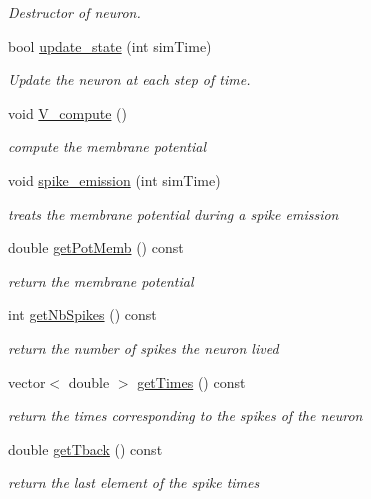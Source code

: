 \begin{DoxyCompactItemize}
\begin{DoxyCompactList}\small\item\em Destructor of neuron. \end{DoxyCompactList}\item 
bool \hyperlink{classNeuron_a27200532368d5d042a7c575ef031f113}{update\-\_\-state} (int sim\-Time)
\begin{DoxyCompactList}\small\item\em Update the neuron at each step of time. \end{DoxyCompactList}\item 
void \hyperlink{classNeuron_a78ad401819336b210c9f0a1b7b676e53}{V\-\_\-compute} ()
\begin{DoxyCompactList}\small\item\em compute the membrane potential \end{DoxyCompactList}\item 
void \hyperlink{classNeuron_a9d1f9ce3ee43c74eb0ff15b72256c417}{spike\-\_\-emission} (int sim\-Time)
\begin{DoxyCompactList}\small\item\em treats the membrane potential during a spike emission \end{DoxyCompactList}\item 
double \hyperlink{classNeuron_a8b4af30d823975f3b2ef3ae534f9ae5f}{get\-Pot\-Memb} () const 
\begin{DoxyCompactList}\small\item\em return the membrane potential \end{DoxyCompactList}\item 
int \hyperlink{classNeuron_ab1efa405eb0cd7bac6ca012c961efe5d}{get\-Nb\-Spikes} () const 
\begin{DoxyCompactList}\small\item\em return the number of spikes the neuron lived \end{DoxyCompactList}\item 
vector$<$ double $>$ \hyperlink{classNeuron_ae78f9ef057b2388e388d8c15343b5644}{get\-Times} () const 
\begin{DoxyCompactList}\small\item\em return the times corresponding to the spikes of the neuron \end{DoxyCompactList}\item 
double \hyperlink{classNeuron_ace97a76a0c9baaefb7985439ed4784b8}{get\-Tback} () const 
\begin{DoxyCompactList}\small\item\em return the last element of the spike times \end{DoxyCompactList}\item 

\end{DoxyCompactItemize}
